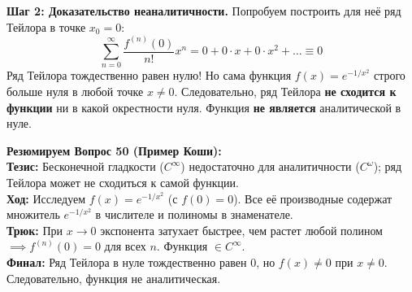\textbf{Шаг 2: Доказательство неаналитичности.}
Попробуем построить для неё ряд Тейлора в точке $x_0 = 0$:
$$ \sum_{n=0}^{\infty} \frac{f^{(n)}(0)}{n!} x^n = 0 + 0 \cdot x + 0 \cdot x^2 + \dots \equiv 0 $$
Ряд Тейлора тождественно равен нулю! Но сама функция $f(x) = e^{-1/x^2}$ строго больше нуля в любой точке $x \ne 0$.
Следовательно, ряд Тейлора \textbf{не сходится к функции} ни в какой окрестности нуля. Функция \textbf{не является} аналитической в нуле.

\begin{tcolorbox}[colback=gray!5, colframe=black, boxrule=0.5pt, arc=0pt]
\textbf{Резюмируем Вопрос 50 (Пример Коши):} \\
\textbf{Тезис:} Бесконечной гладкости ($C^\infty$) недостаточно для аналитичности ($C^\omega$); ряд Тейлора может не сходиться к самой функции. \\
\textbf{Ход:} Исследуем $f(x) = e^{-1/x^2}$ (с $f(0)=0$). Все её производные содержат множитель $e^{-1/x^2}$ в числителе и полиномы в знаменателе. \\
\textbf{Трюк:} При $x \to 0$ экспонента затухает быстрее, чем растет любой полином $\implies f^{(n)}(0) = 0$ для всех $n$. Функция $\in C^\infty$. \\
\textbf{Финал:} Ряд Тейлора в нуле тождественно равен $0$, но $f(x) \ne 0$ при $x \ne 0$. Следовательно, функция не аналитическая.
\end{tcolorbox}